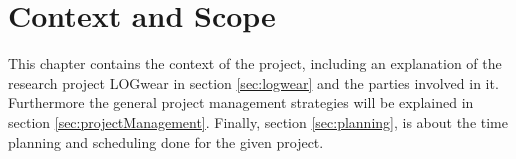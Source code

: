 \chapter{Context and Scope}\label{cha:context}
This chapter contains the context of the project, including an explanation of the research project LOGwear in section \ref{sec:logwear} and the parties involved in it. Furthermore the general project management strategies will be explained in section \ref{sec:projectManagement}. %
Finally, section \ref{sec:planning}, is about the time planning and scheduling done for the given project.

%
%

